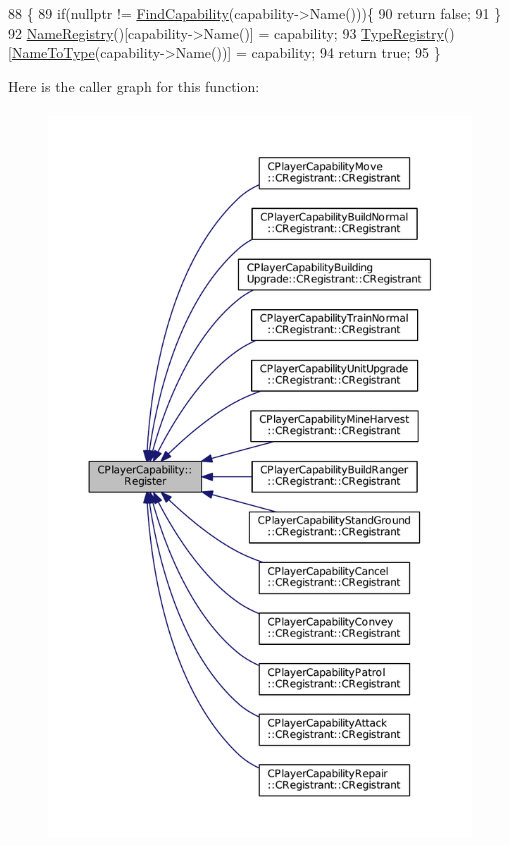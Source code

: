 \begin{DoxyCode}
88                                                                              \{
89     \textcolor{keywordflow}{if}(\textcolor{keyword}{nullptr} != \hyperlink{classCPlayerCapability_a881ba4b87385d7cfe5cb6ced2d26f226}{FindCapability}(capability->Name()))\{
90         \textcolor{keywordflow}{return} \textcolor{keyword}{false};    
91     \}
92     \hyperlink{classCPlayerCapability_aa804d42c236f11ec9549057c22699837}{NameRegistry}()[capability->Name()] = capability;
93     \hyperlink{classCPlayerCapability_ab7fee932703792663278b1b2128f00f3}{TypeRegistry}()[\hyperlink{classCPlayerCapability_a920a696526e8a839f728192aea0ba1c5}{NameToType}(capability->Name())] = capability;
94     \textcolor{keywordflow}{return} \textcolor{keyword}{true};
95 \}
\end{DoxyCode}
Here is the caller graph for this function\+:\nopagebreak
\begin{figure}[H]
\begin{center}
\leavevmode
\includegraphics[height=550pt]{classCPlayerCapability_a7e298018dcde2684451add3cfff065f7_icgraph}
\end{center}
\end{figure}
\hypertarget{classCPlayerCapability_a022d6efcdc0897253d7c2e33ade0851d}{}\label{classCPlayerCapability_a022d6efcdc0897253d7c2e33ade0851d} 
